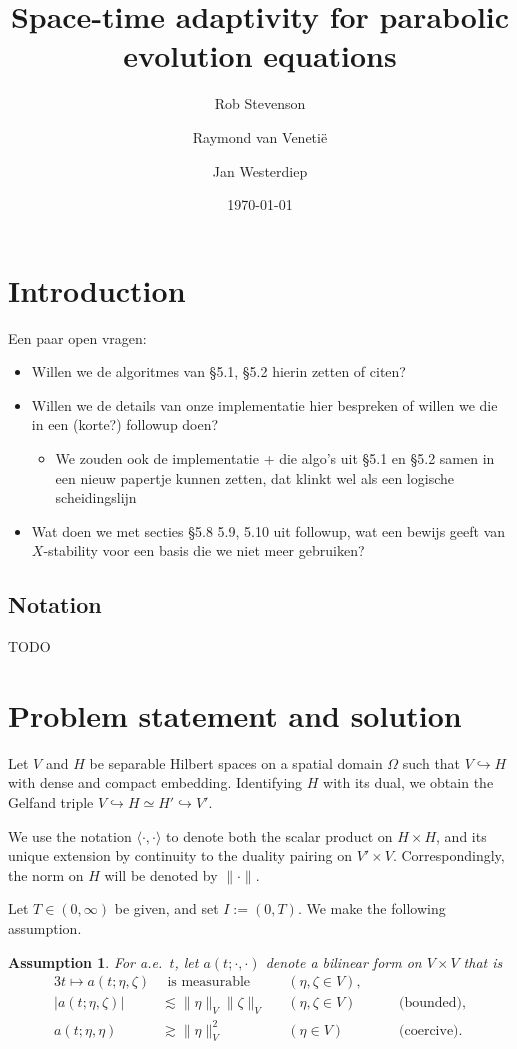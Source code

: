 \documentclass[11pt,a4paper,oneside,english]{amsart}
\title{Space-time adaptivity for parabolic evolution equations}
\author{Rob Stevenson \and Raymond van Veneti\"e \and Jan Westerdiep}
\date{\today}
\numberwithin{equation}{section}
\numberwithin{theorem}{section}
\newtheorem{assum}[theorem]{Assumption}
\theoremstyle{definition}
\newcommand{\la}{\langle}
\newcommand{\ra}{\rangle}
\begin{document}
\begin{abstract}
\end{abstract}

\maketitle

\section{Introduction}
Een paar open vragen:
\begin{itemize}
  \item Willen we de algoritmes van \S 5.1, \S 5.2 hierin zetten of citen?
  \item Willen we de details van onze implementatie hier bespreken of willen we die in een (korte?) followup doen?
    \begin{itemize}
      \item We zouden ook de implementatie + die algo's uit \S 5.1 en \S 5.2 samen in een nieuw papertje kunnen zetten, dat klinkt wel als een logische scheidingslijn
    \end{itemize}
  \item Wat doen we met secties \S 5.8 5.9, 5.10 uit followup, wat een bewijs geeft van $X$-stability voor een basis die we niet meer gebruiken?

\end{itemize}
\subsection{Notation}
TODO
\section{Problem statement and solution}
Let $V$ and $H$ be separable Hilbert spaces on a spatial domain $\Omega$ such that
$V \hookrightarrow H$ with dense and compact embedding. Identifying $H$ with its
dual, we obtain the Gelfand triple $V \hookrightarrow H \simeq H' \hookrightarrow V'$.

We use the notation $\la \cdot,\cdot \ra$ to denote both the scalar product
on $H \times H$, and its unique extension by continuity to the duality pairing on
$V' \times V$. Correspondingly, the norm on $H$ will be denoted by $\|\cdot\|$.

Let $T \in (0, \infty)$ be given, and set $I := (0, T)$. We make the following assumption.
\begin{assum}
  \label{assum:a}
  For a.e.~$t$, let $a(t;\cdot,\cdot)$ denote a bilinear form on $V \times V$ that is
  \begin{alignat*}{3}
    t \mapsto a(t; \eta, \zeta) & ~~ \text{is measurable} \quad && (\eta, \zeta \in V), \\
    |a(t;\eta,\zeta)| & \lesssim  \|\eta\|_{V} \|\zeta\|_{V} &&(\eta,\zeta \in V) &\quad&\text{(bounded)}, \\
     a(t;\eta,\eta)   & \gtrsim   \|\eta\|_{V}^2 &&(\eta \in {V}) &&\text{(coercive)}.
  \end{alignat*}
\end{assum}
\end{document}

